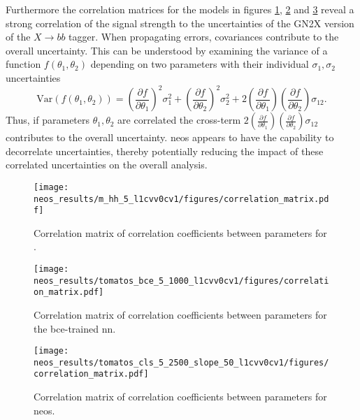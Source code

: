 Furthermore the correlation matrices for the models in figures \ref{fig:correlation_matrix_m_hh}, \ref{fig:correlation_matrix_bce} and \ref{fig:correlation_matrix_cls} reveal a strong correlation of the signal strength to the uncertainties of the GN2X version of the $X\rightarrow bb$ tagger. When propagating errors, covariances contribute to the overall uncertainty. This can be understood by examining the variance of a function $f(\theta_1, \theta_2)$ depending on two parameters with their individual $\sigma_1,\sigma_2$ uncertainties
\begin{equation}
    \text{Var}(f(\theta_1, \theta_2)) = \left( \frac{\partial f}{\partial \theta_1} \right)^2 \sigma_1^2 + \left( \frac{\partial f}{\partial \theta_2} \right)^2 \sigma_2^2 + 2 \left( \frac{\partial f}{\partial \theta_1} \right) \left( \frac{\partial f}{\partial \theta_2} \right) \sigma_{12}.
\end{equation}
Thus, if parameters $\theta_1, \theta_2$ are correlated the cross-term \(2 \left( \frac{\partial f}{\partial \theta_1} \right) \left( \frac{\partial f}{\partial \theta_2} \right) \sigma_{12}\) contributes to the overall uncertainty. \ac{neos} appears to have the capability to decorrelate uncertainties, thereby potentially reducing the impact of these correlated uncertainties on the overall analysis. 

\begin{figure}
    \centering
    \texttt{[image: neos\_results/m\_hh\_5\_l1cvv0cv1/figures/correlation\_matrix.pdf]}
    \caption[]{Correlation matrix of correlation coefficients between parameters for \mhh.}
    \label{fig:correlation_matrix_m_hh}
\end{figure}
\begin{figure}
    \centering
    \texttt{[image: neos\_results/tomatos\_bce\_5\_1000\_l1cvv0cv1/figures/correlation\_matrix.pdf]}
    \caption[]{Correlation matrix of correlation coefficients between parameters for the \ac{bce}-trained \ac{nn}.}
    \label{fig:correlation_matrix_bce}
\end{figure}
\begin{figure}
    \centering
    \texttt{[image: neos\_results/tomatos\_cls\_5\_2500\_slope\_50\_l1cvv0cv1/figures/correlation\_matrix.pdf]}
    \caption[]{Correlation matrix of correlation coefficients between parameters for \ac{neos}.}
    \label{fig:correlation_matrix_cls}
\end{figure}

